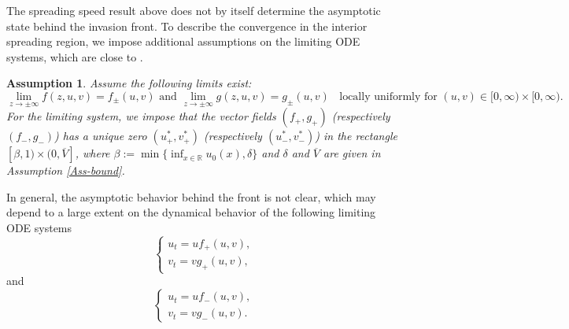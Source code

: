 \documentclass[10pt]{article}
\numberwithin{equation}{section}
\newcommand{\R}{\mathbb{R}}
\newtheorem{assumption}[theorem]{Assumption}
\begin{document}
 
 The spreading speed result above does not by itself determine the asymptotic state behind the invasion front. To describe the convergence in the interior spreading region, we impose additional assumptions on the limiting ODE systems, which are close to  \cite[Assumption 2.5]{ducrot2019spreading}. 
 
\begin{assumption}\label{Ass-limit}
Assume the following limits  exist:
\begin{equation*}
\lim_{z\to \pm \infty} f(z, u, v) = f_\pm (u, v)  \text{ and }  \lim_{z\to \pm \infty} g(z, u, v) = g_\pm (u, v) \;\;  \text{ locally uniformly for } (u, v) \in [0, \infty) \times [0, \infty). 
\end{equation*}
For the limiting system, we impose that the vector fields $(f_{+},  g_+)$  (respectively $(f_-,  g_-)$) has a unique zero  $(u^*_+, v^*_+)$ (respectively $(u^*_-, v^*_-)$) in  the rectangle $[\beta, 1) \times (0, \overline{V}]$, where  $\beta:= \min\{\inf_{x\in\R} u_0(x), \delta \}$ and $\delta$ and  $\overline{V} $ are given in Assumption \ref{Ass-bound}.
\end{assumption}
  In general, the asymptotic behavior behind the front is not clear, which may depend to a large extent  on the dynamical  behavior of the following  limiting  ODE systems    
 \begin{equation}\label{ode1}
 \begin{cases}
 u_t= u f_+(u, v),\\
 v_t= vg_+(u,v),
 \end{cases}
 \end{equation} 
 and 
  \begin{equation}\label{ode2}
  \begin{cases}
  u_t= u f_-(u, v), \\
  v_t= vg_-(u,v).
  \end{cases}
  \end{equation} 
  
\end{document}
